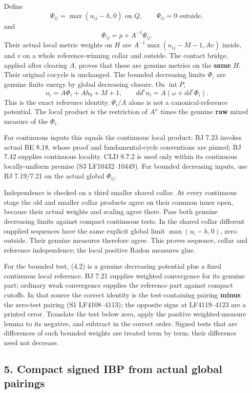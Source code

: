 \documentclass[
  10pt,
]{article}
\begin{document}
Define
\[\Psi_{ij}=\max(u_{ij}-h,0)\text{ on }Q,\qquad \Psi_{ij}=0\text{ outside},\]
and \[\Phi_{ij}=p+A^{-1}\Psi_{ij}. \tag{4.1}\] Their actual local metric
weights on \(H\) are \(A^{-1}\max(u_{ij}-M-1,Av)\) inside, and \(v\) on
a whole reference-winning collar and outside. The contact bridge,
applied after clearing \(A\), proves that these are genuine metrics on
the \textbf{same} \(H\). Their original cocycle is unchanged. The
bounded decreasing limits \(\Phi_i\) are genuine finite energy by global
decreasing closure. On \(\operatorname{int}P\),
\[u_i=A\Phi_i+Ah_0+M+1,\qquad
dd^c u_i=A(\omega+dd^c\Phi_i). \tag{4.2}\] This is the exact reference
identity. \(\Psi_i/A\) alone is not a canonical-reference potential. The
local product is the restriction of \(A^n\) times the genuine
\textbf{raw} mixed measure of the \(\Phi_i\).

For continuous inputs this equals the continuous local product: BJ 7.23
invokes actual BE 8.18, whose proof and fundamental-cycle conventions
are pinned; BJ 7.42 supplies continuous locality. CLD 8.7.2 is used only
within its continuous locally-uniform premise (S3 LF10432--10449). For
bounded decreasing inputs, use BJ 7.19/7.21 on the actual global
\(\Phi_{ij}\).

Independence is checked on a third smaller shared collar. At every
continuous stage the old and smaller collar products agree on their
common inner open, because their actual weights and scaling agree there.
Pass both genuine decreasing limits against compact continuous tests. In
the shared collar different supplied sequences have the same explicit
global limit \(\max(u_i-h,0)\), zero outside. Their genuine measures
therefore agree. This proves sequence, collar and reference
independence; the local positive Radon measures glue.

For the bounded test, (4.2) is a genuine decreasing potential plus a
fixed continuous local reference. BJ 7.21 supplies weighted convergence
for its genuine part; ordinary weak convergence supplies the reference
part against compact cutoffs. In that source the correct identity is the
test-containing pairing \textbf{minus} the zero-test pairing (S1
LF4108--4113); the opposite signs at LF4119--4123 are a printed error.
Translate the test below zero, apply the positive weighted-measure lemma
to its negative, and subtract in the correct order. Signed tests that
are differences of such bounded weights are treated term by term; their
difference need not decrease.

\subsection{5. Compact signed IBP from actual global
pairings}\label{compact-signed-ibp-from-actual-global-pairings}
\end{document}

